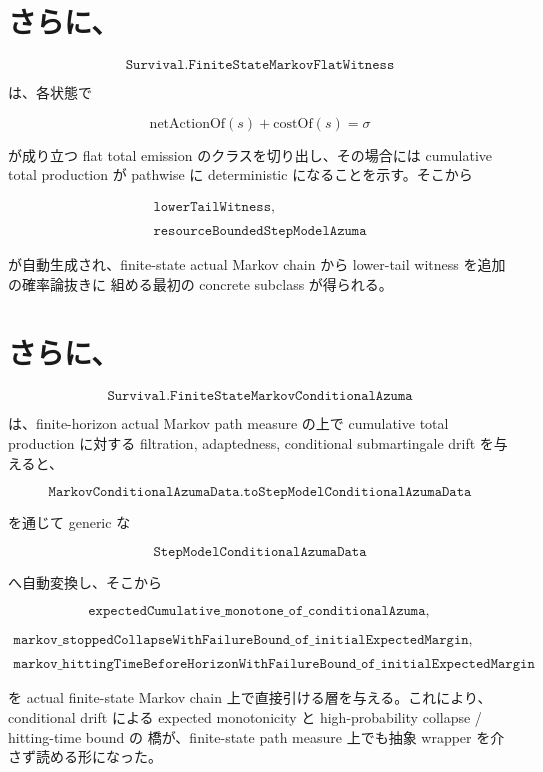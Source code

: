 \documentclass[12pt,a4paper]{article}
\begin{document}
\section{さらに、}\label{ux3055ux3089ux306b-1}

\[
\texttt{Survival.FiniteStateMarkovFlatWitness}
\]

は、各状態で

\[
\mathrm{netActionOf}(s)+\mathrm{costOf}(s)=\sigma
\]

が成り立つ flat total emission のクラスを切り出し、その場合には cumulative total production が pathwise に deterministic になることを示す。そこから

\[
\begin{aligned}
\texttt{lowerTailWitness}, \\
\qquad \\
\texttt{resourceBoundedStepModelAzuma}
\end{aligned}
\]

が自動生成され、finite-state actual Markov chain から lower-tail witness を追加の確率論抜きに 組める最初の concrete subclass が得られる。

\section{さらに、}\label{ux3055ux3089ux306b-2}

\[
\texttt{Survival.FiniteStateMarkovConditionalAzuma}
\]

は、finite-horizon actual Markov path measure の上で cumulative total production に対する filtration, adaptedness, conditional submartingale drift を与えると、

\[
\texttt{MarkovConditionalAzumaData.toStepModelConditionalAzumaData}
\]

を通じて generic な

\[
\texttt{StepModelConditionalAzumaData}
\]

へ自動変換し、そこから

\[
\texttt{expectedCumulative\_monotone\_of\_conditionalAzuma},
\]

\[
\begin{aligned}
\texttt{markov\_stoppedCollapseWithFailureBound\_of\_initialExpectedMargin}, \\
\qquad \\
\texttt{markov\_hittingTimeBeforeHorizonWithFailureBound\_of\_initialExpectedMargin}
\end{aligned}
\]

を actual finite-state Markov chain 上で直接引ける層を与える。これにより、 conditional drift による expected monotonicity と high-probability collapse / hitting-time bound の 橋が、finite-state path measure 上でも抽象 wrapper を介さず読める形になった。
\end{document}
